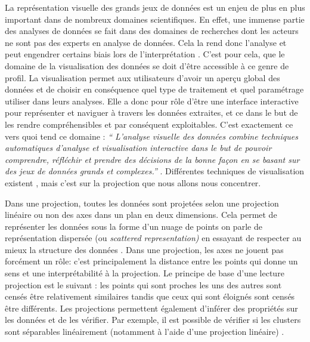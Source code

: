 
La représentation visuelle des grands jeux de données est un enjeu de plus en plus important dans de nombreux domaines scientifiques. En effet, une immense partie des analyses de données se fait dans des domaines de recherches dont les acteurs ne sont pas des experts en analyse de données. Cela la rend donc l’analyse et peut engendrer certains biais lors de l'interprétation \cite{HeulotAnEvaluation}. C’est pour cela, que le domaine de la visualisation des données se doit d’être accessible à ce genre de profil.\newline
La visualisation permet aux utilisateurs d’avoir un aperçu global des données et de choisir en conséquence quel type de traitement et quel paramétrage utiliser dans leurs analyses. Elle a donc pour rôle d’être une interface interactive pour représenter et naviguer à travers les données extraites, et ce dans le but de les rendre compréhensibles et par conséquent exploitables\cite{card1999readings}. C’est exactement ce vers quoi tend ce domaine : \textit{“ L'analyse visuelle des données combine techniques automatiques d'analyse et visualisation interactive dans le but de pouvoir comprendre, réfléchir et prendre des décisions de la bonne façon en se basant sur des jeux de données grands et complexes.”} \cite{keim2008visual}. 
Différentes techniques de visualisation existent \cite{HeulotThese}, mais c’est sur la projection que nous allons nous concentrer. 
\smallskip

    Dans une projection, toutes les données sont projetées selon une projection linéaire ou non des axes dans un plan en deux dimensions. Cela permet de représenter les données sous la forme d’un nuage de points on parle de représentation dispersée (ou \textit{scattered representation)} en essayant de respecter au mieux la structure des données \cite{HeulotThese}. \newline 
    Dans une projection, les axes ne jouent pas forcément un rôle: c’est principalement la distance entre les points qui donne un sens et une interprétabilité à la projection\cite{koffka1997PsychoGesttalt}. 
    Le principe de base d'une lecture projection est le suivant : les points qui sont proches les uns des autres sont censés être relativement similaires tandis que ceux qui sont éloignés sont censés être différents. \newline 
    Les projections permettent également d’inférer des propriétés sur les données et de les vérifier. Par exemple, il est possible de vérifier si les clusters sont séparables linéairement (notamment à l’aide d’une projection linéaire) \cite{HeulotThese} .
\smallskip


